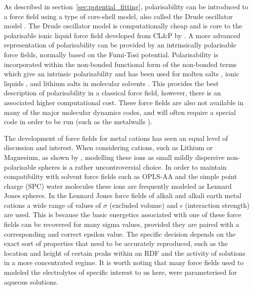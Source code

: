 \documentclass[../main.tex]{subfiles}
\begin{document}
As described in section~\ref{sec:potential_fitting}, polarisability can be introduced to a force field using a type of core-shell model, also called the Drude oscillator model \cite{schroder_polarizable_2020, schroder_comparing_2012, lindahl_gromacs_2021}. The Drude oscillator model is computationally cheap and is core to the polarisable ionic liquid force field developed from CL\&P by \citeauthor{schroder_comparing_2012} \cite{schroder_comparing_2012}. A more advanced representation of polarisability can be provided by an intrinsically polarisable force fields, normally based on the Fumi-Tosi potential. \cite{sangster1976interionic} Polarisability is incorporated within the non-bonded functional form of the non-bonded terms which give an intrinsic polarisability and has been used for molten salts \cite{madden_covalent_1996}, ionic liquids \cite{borodin_polarizable_2009, schroder_polarizable_2020}, and lithium salts in molecular solvents \cite{borodin_litfsi_2006,bedrov_molecular_2019,bedrov_influence_2010}. This provides the best description of polarisability in a classical force field, however, there is an associated higher computational cost. These force fields are also not available in many of the major molecular dynamics codes, and will often require a special code in order to be run (such as the metalwalls \cite{marin-lafleche_metalwalls_2020}).

The development of force fields for metal cations has seen an equal level of discussion and interest. When considering cations, such as Lithium or Magnesium, as shown by \citeauthor{mamatkulov_force_2013} \cite{mamatkulov_force_2013,mamatkulov_force_2018}, modelling these ions as small mildly dispersive non-polarisable spheres is a rather uncontroversial choice\cite{schroder_polarizable_2020}. In order to maintain compatibility with solvent force fields such as OPLS-AA and the simple point charge (SPC) water molecules these ions are frequently modeled as Lennard Jones spheres. In the Lennard Jones force fields of alkali and alkali earth metal cations a wide range of values of $\sigma$ (excluded volume) and $\epsilon$ (interaction strength) are used. This is because the basic energetics associated with one of these force fields can be recovered for many sigma values, provided they are paired with a corresponding and correct epsilon value. The specific decision depends on the exact sort of properties that need to be accurately reproduced, such as the location and height of certain peaks within an RDF and the activity of solutions in a more concentrated regime\cite{mamatkulov_force_2013}. It is worth noting that many force fields used to modeled the electrolytes of specific interest to us here, were parameterised for aqueous solutions.
\end{document}
